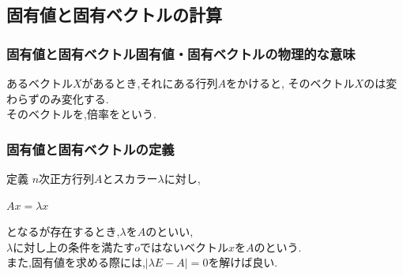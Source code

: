 \documentclass[a4paper]{jsarticle}
\begin{document}
\subsection{固有値と固有ベクトルの計算}
\subsubsection{固有値と固有ベクトル固有値・固有ベクトルの物理的な意味}
あるベクトル$X$があるとき,それにある行列$A$をかけると,
そのベクトル$X$のは変わらずのみ変化する.\\
そのベクトルを,倍率をという.\\
\subsubsection{固有値と固有ベクトルの定義}
\begin{itembox}[l]{定義}
    $n$次正方行列$A$とスカラー$\lambda$に対し,
    \begin{center}
        $Ax=\lambda x$
    \end{center}
    となるが存在するとき,$\lambda$を$A$のといい,\\
    $\lambda$に対し上の条件を満たす$o$ではないベクトル$x$を$A$のという.\\
    また,固有値を求める際には,$|\lambda E-A|=0$を解けば良い.
\end{itembox}
\end{document}
